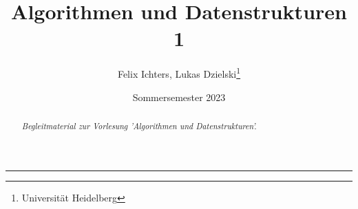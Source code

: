 \documentclass[DIV=12]{scrartcl}
\title{Algorithmen und Datenstrukturen 1}
\author{Felix Ichters, Lukas Dzielski\thanks{Universität Heidelberg}}
\date{Sommersemester 2023}
\begin{document}
\maketitle
\rule{\textwidth}{0.4pt}
\begin{abstract}
    \begin{flushright}
        \textit{Begleitmaterial zur Vorlesung 'Algorithmen und Datenstrukturen'.}
    \end{flushright}    
\end{abstract}
\par\bigskip
\begin{center}
\end{center}
\newpage
\tableofcontents
\newpage


\end{document}
